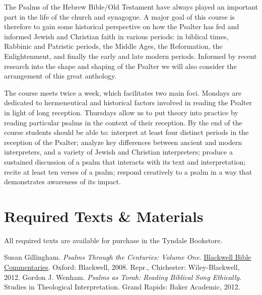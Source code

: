 \documentclass[titlepage]{article}
\begin{document}
The Psalms of the Hebrew Bible/Old Testament have always played an
important part in the life of the church and synagogue. A major goal of
this course is therefore to gain some historical perspective on how the
Psalter has fed and informed Jewish and Christian faith in various
periods: in biblical times, Rabbinic and Patristic periods, the Middle
Ages, the Reformation, the Enlightenment, and finally the early and late
modern periods. Informed by recent research into the shape and shaping
of the Psalter we will also consider the arrangement of this great
anthology.

The course meets twice a week, which facilitates two main foci. Mondays
are dedicated to hermeneutical and historical factors involved in
reading the Psalter in light of long reception. Thursdays allow us to
put theory into practice by reading particular psalms in the context of
their reception. By the end of the course students should be able to:
interpret at least four distinct periods in the reception of the
Psalter; analyze key differences between ancient and modern
interpreters, and a variety of Jewish and Christian interpreters;
produce a sustained discussion of a psalm that interacts with its text
and interpretation; recite at least ten verses of a psalm; respond
creatively to a psalm in a way that demonstrates awareness of its impact.

\section{Required Texts \& Materials}
\label{texts}

All required texts are available for purchase in the Tyndale Bookstore.

\begingroup
\renewcommand{\section}[2]{}%
\begin{thebibliography}{Gillingham}%
    Susan Gillingham. \emph{Psalms Through the Centuries: Volume One}.
    \href{http://bbibcomm.net/}{Blackwell Bible Commentaries}. Oxford:
    Blackwell, 2008. Repr., Chichester: Wiley-Blackwell, 2012.
    Gordon J. Wenham. \emph{Psalms as Torah: Reading Biblical Song
    Ethically}. Studies in Theological Interpretation. Grand Rapids:
    Baker Academic, 2012.
\end{thebibliography}
\endgroup
\end{document}
